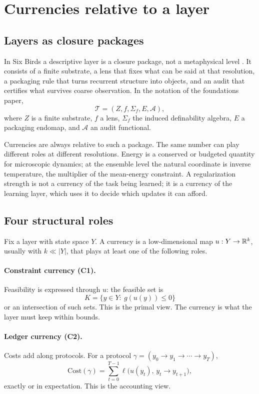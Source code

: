 \section{Currencies relative to a layer}\label{sec:framework}

\subsection{Layers as closure packages}

In Six Birds a descriptive layer is a closure package, not a metaphysical level \cite{tsiokos2026sixbirds}. It consists of a finite substrate, a lens that fixes what can be said at that resolution, a packaging rule that turns recurrent structure into objects, and an audit that certifies what survives coarse observation. In the notation of the foundations paper,
\[
\mathcal T=(Z,f,\Sigma_f,E,\mathcal A),
\]
where \(Z\) is a finite substrate, \(f\) a lens, \(\Sigma_f\) the induced definability algebra, \(E\) a packaging endomap, and \(\mathcal A\) an audit functional.

Currencies are always relative to such a package. The same number can play different roles at different resolutions. Energy is a conserved or budgeted quantity for microscopic dynamics; at the ensemble level the natural coordinate is inverse temperature, the multiplier of the mean-energy constraint. A regularization strength is not a currency of the task being learned; it is a currency of the learning layer, which uses it to decide which updates it can afford.

\subsection{Four structural roles}

Fix a layer with state space \(Y\). A currency is a low-dimensional map \(u:Y\to\mathbb{R}^k\), usually with \(k\ll|Y|\), that plays at least one of the following roles.

\paragraph{Constraint currency (C1).} Feasibility is expressed through \(u\): the feasible set is
\[
K=\{y\in Y:\ g(u(y))\le 0\}
\]
or an intersection of such sets. This is the primal view. The currency is what the layer must keep within bounds.

\paragraph{Ledger currency (C2).} Costs add along protocols. For a protocol \(\gamma=(y_0\to y_1\to\cdots\to y_T)\),
\[
\mathrm{Cost}(\gamma)=\sum_{t=0}^{T-1}\ell\big(u(y_t),\,y_t\to y_{t+1}\big),
\]
exactly or in expectation. This is the accounting view.

